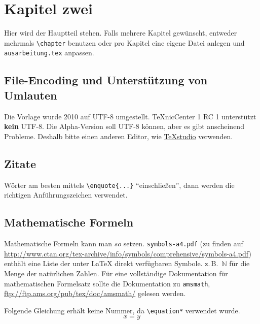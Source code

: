 \chapter{Kapitel zwei}
\label{chap:k2}

Hier wird der Hauptteil stehen. Falls mehrere Kapitel gewünscht, entweder mehrmals \texttt{\textbackslash{}chapter} benutzen oder pro Kapitel eine eigene Datei anlegen und \texttt{ausarbeitung.tex} anpassen.

\section{File-Encoding und Unterstützung von Umlauten}
Die Vorlage wurde 2010 auf UTF-8 umgestellt.
TeXnicCenter 1 RC 1 unterstützt \textbf{kein} UTF-8.
Die Alpha-Version soll UTF-8 können, aber es gibt anscheinend Probleme.
Deshalb bitte einen anderen Editor, wie \zB \href{http://texstudio.sourceforge.net/}{TeXstudio} verwenden.

\section{Zitate}
Wörter am besten mittels \texttt{\textbackslash enquote\{...\}} \enquote{einschließen}, dann werden die richtigen Anführungszeichen verwendet.

\section{Mathematische Formeln}
\label{sec:mf}
Mathematische Formeln kann man $so$ setzen. \texttt{symbols-a4.pdf} (zu finden auf \url{http://www.ctan.org/tex-archive/info/symbols/comprehensive/symbols-a4.pdf}) enthält eine Liste der unter LaTeX direkt verfügbaren Symbole. z.\,B.\ $\mathbb{N}$ für die Menge der natürlichen Zahlen. Für eine vollständige Dokumentation für mathematischen Formelsatz sollte die Dokumentation zu \texttt{amsmath}, \url{ftp://ftp.ams.org/pub/tex/doc/amsmath/} gelesen werden.

Folgende Gleichung erhält keine Nummer, da \texttt{\textbackslash equation*} verwendet wurde.
\begin{equation*}
x = y
\end{equation*}

